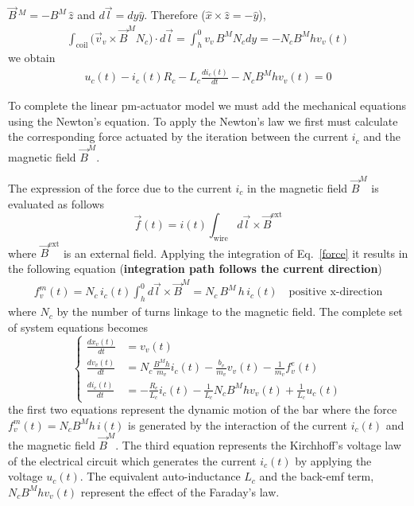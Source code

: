 \documentclass[11pt,a4paper,oneside]{book}
\numberwithin{equation}{section}
\theoremstyle{it}
\theoremstyle{definition}
\begin{document}
$\vec{B}\,^M=-B^M\,\hat{z}$ and $d\vec{l}=dy\hat{y}$. Therefore 
($\hat{x}\times\hat{z}=-\hat{y}$), 
\begin{equation}\label{jackson_11}
	\begin{aligned}
		\int_{\text{coil}}\big(\vec{v}_v\times\vec{B}^MN_c\big)\cdot d\vec{l} = 
		\int_{h}^{0}v_v\,B^MN_cdy = -N_cB^Mhv_v(t)
	\end{aligned}
\end{equation} 
we obtain
\begin{equation}\label{jackson_12}
	\boxed{	\begin{aligned}
			u_c(t) - i_c(t)R_c-L_c\frac{di_c(t)}{dt}-N_cB^Mhv_v(t)=0
	\end{aligned}}
\end{equation}

To complete the linear pm-actuator model we must add the mechanical equations 
using the Newton's equation. To apply the Newton's law we first must calculate 
the corresponding force actuated by the iteration between the current $i_c$ and 
the magnetic field $\vec{B}^M$.


The expression of the force due to the current $i_c$ in the magnetic field 
$\vec{B}^M$ is evaluated as follows 
\begin{equation}\label{force}
	\vec{f}(t) = i(t)\int_{\text{wire}}d\vec{l}\times\vec{B}^{\text{ext}}
\end{equation}
where $\vec{B}^{\text{ext}}$ is an external field. Applying the integration of 
Eq.~\ref{force} it results in the following equation (\textbf{integration path 
follows the current direction})
\begin{equation}\label{linact_8}
	\begin{aligned}
		f_v^m(t) = 
		N_c\,i_c(t)\int_{h}^{0}d\vec{l}\times\vec{B}^M=N_c\,B^M\,h\,i_c(t)\quad 
		\text{positive x-direction}
	\end{aligned}
\end{equation}
where $N_c$ by the number of turns linkage to the magnetic field.
The complete set of system equations becomes
\begin{equation}\label{linact_9}
	\left\lbrace \begin{aligned}
		\frac{dx_v(t)}{dt} &= v_v(t) \\[6pt]
		\frac{dv_v(t)}{dt} &= N_c\frac{B^Mh}{m_v} i_c(t)-\frac{b_v}{m_v} 
		v_v(t)-\frac{1}{m_v}f^e_v(t) \\[6pt]
		\frac{di_c(t)}{dt} &= 
		-\frac{R_c}{L_c}i_c(t)-\frac{1}{L_c}N_cB^Mhv_v(t)+\frac{1}{L_c}u_c(t)
	\end{aligned}\right. 
\end{equation}
the first two equations represent the dynamic motion of the bar where the force 
$f_v^m(t)=N_cB^Mh\,i(t)$ is generated by the interaction of the current 
$i_c(t)$ and the magnetic field $\vec{B}^M$. The third equation represents the 
Kirchhoff's voltage law of the electrical circuit which generates the current 
$i_c(t)$ by applying the voltage $u_c(t)$. The equivalent auto-inductance $L_c$ 
and the back-emf term, $N_cB^Mhv_v(t)$ represent the effect of the Faraday's 
law.
\end{document}
